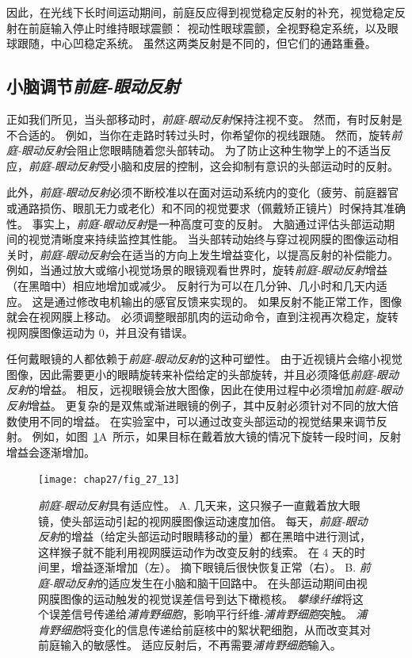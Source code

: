 因此，在光线下长时间运动期间，前庭反应得到视觉稳定反射的补充，视觉稳定反射在前庭输入停止时维持眼球震颤：
视动性眼球震颤，全视野稳定系统，以及眼球跟随，中心凹稳定系统。
虽然这两类反射是不同的，但它们的通路重叠。



\subsection{小脑调节\textit{前庭-眼动反射}}

正如我们所见，当头部移动时，\textit{前庭-眼动反射}保持注视不变。
然而，有时反射是不合适的。
例如，当你在走路时转过头时，你希望你的视线跟随。
然而，旋转\textit{前庭-眼动反射}会阻止您眼睛随着您头部转动。
为了防止这种生物学上的不适当反应，\textit{前庭-眼动反射}受小脑和皮层的控制，这会抑制有意识的头部运动时的反射。


此外，\textit{前庭-眼动反射}必须不断校准以在面对运动系统内的变化（疲劳、前庭器官或通路损伤、眼肌无力或老化）和不同的视觉要求（佩戴矫正镜片）时保持其准确性。
事实上，\textit{前庭-眼动反射}是一种高度可变的反射。
大脑通过评估头部运动期间的视觉清晰度来持续监控其性能。
当头部转动始终与穿过视网膜的图像运动相关时，\textit{前庭-眼动反射}会在适当的方向上发生增益变化，以提高反射的补偿能力。
例如，当通过放大或缩小视觉场景的眼镜观看世界时，旋转\textit{前庭-眼动反射}增益（在黑暗中）相应地增加或减少。
反射行为可以在几分钟、几小时和几天内适应。
这是通过修改电机输出的感官反馈来实现的。
如果反射不能正常工作，图像就会在视网膜上移动。
必须调整眼部肌肉的运动命令，直到注视再次稳定，旋转视网膜图像运动为 0，并且没有错误。


任何戴眼镜的人都依赖于\textit{前庭-眼动反射}的这种可塑性。
由于近视镜片会缩小视觉图像，因此需要更小的眼睛旋转来补偿给定的头部旋转，并且必须降低\textit{前庭-眼动反射}的增益。
相反，远视眼镜会放大图像，因此在使用过程中必须增加\textit{前庭-眼动反射}增益。
更复杂的是双焦或渐进眼镜的例子，其中反射必须针对不同的放大倍数使用不同的增益。
在实验室中，可以通过改变头部运动的视觉结果来调节反射。 
例如，如图~\ref{fig:27_13}A~所示，如果目标在戴着放大镜的情况下旋转一段时间，反射增益会逐渐增加。


\begin{figure}[htbp]
	\centering
	\texttt{[image: chap27/fig\_27\_13]}
	\caption{\textit{前庭-眼动反射}具有适应性。
		A. 几天来，这只猴子一直戴着放大眼镜，使头部运动引起的视网膜图像运动速度加倍。
		每天，\textit{前庭-眼动反射}的增益（给定头部运动时眼睛移动的量）都在黑暗中进行测试，这样猴子就不能利用视网膜运动作为改变反射的线索。
		在 4 天的时间里，增益逐渐增加（左）。
		摘下眼镜后很快恢复正常（右）\cite{miles1980long}。
		B. \textit{前庭-眼动反射}的适应发生在小脑和脑干回路中。
		在头部运动期间由视网膜图像的运动触发的视觉误差信号到达下橄榄核。
		\textit{攀缘纤维}将这个误差信号传递给\textit{浦肯野细胞}，影响平行纤维-\textit{浦肯野细胞}突触。
		\textit{浦肯野细胞}将变化的信息传递给前庭核中的絮状靶细胞，从而改变其对前庭输入的敏感性。
		适应反射后，不再需要\textit{浦肯野细胞}输入。}
	\label{fig:27_13}
\end{figure}


